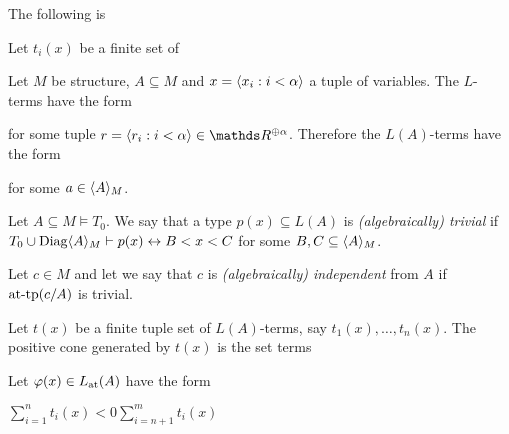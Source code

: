\documentclass[creche.tex]{subfiles}
\begin{document}
The following is 

\begin{proposition}
Let $t_i(x)$ be a finite set of  
\end{proposition}

Let $M$ be structure, $A\subseteq M$ and $x=\<x_i:i<\alpha\>$ a tuple of variables. The $L$-terms have the form 


for some tuple $r=\<r_i:i<\alpha\>\in\RR^{\oplus\alpha}$. Therefore the $L(A)$-terms have the form 


for some $a\in\<A\>_M$. 

Let $A\subseteq M\models T_0$. We say that a type $p(x)\subseteq L(A)$ is \emph{(algebraically) trivial\/} if $T_0\cup\Diag\<A\>_M\proves p(x) \iff B<x<C$ for some $B,C\subseteq\<A\>_M$. 

Let $c\in M$ and let we say that $c$ is \emph{(algebraically) independent\/} from $A$ if $\attp(c/A)$ is trivial.  

Let $t(x)$ be a finite tuple set of $L(A)$-terms, say $t_1(x),\dots,t_n(x)$. The positive cone generated by $t(x)$ is the set terms 

\def\cone{{\rm cone_+}}

\begin{proposition}
Let $\phi(x)\in L_{\rm at}(A)$ have the form

$\displaystyle\sum^n_{i=1}t_i(x)<0 \sum^m_{i=n+1}t_i(x)$
\end{proposition}
\end{document}
